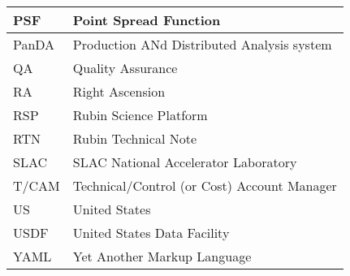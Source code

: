 \begin{longtable}{p{}p{}}
PSF & Point Spread Function \\\hline
PanDA &  Production ANd Distributed Analysis system \\\hline
QA & Quality Assurance \\\hline
RA & Right Ascension \\\hline
RSP & Rubin Science Platform \\\hline
RTN & Rubin Technical Note \\\hline
SLAC & SLAC National Accelerator Laboratory \\\hline
T/CAM & Technical/Control (or Cost) Account Manager \\\hline
US & United States \\\hline
USDF & United States Data Facility \\\hline
YAML & Yet Another Markup Language \\\hline
\end{longtable}

